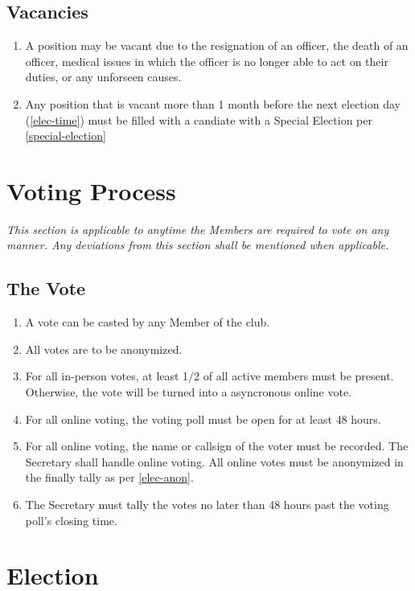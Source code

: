 \documentclass[a4paper,12pt]{article}
\begin{document}
\subsection{Vacancies}
\begin{enumerate}
  \item A position may be vacant due to the resignation of an officer, the death of an officer, medical issues in which the officer is no longer able to act on their duties, or any unforseen causes.
  \item Any position that is vacant more than 1 month before the next election day (\cref{elec-time}) must be filled with a candiate with a Special Election per \cref{special-election}
\end{enumerate}

\section{Voting Process} \label{Voting}
\textit{This section is applicable to anytime the Members are required to vote on any manner. Any deviations from this section shall be mentioned when applicable.}
\subsection{The Vote}
\begin{enumerate}
  \item A vote can be casted by any Member of the club.
  \item \label{elec-anon} All votes are to be anonymized.
  \item For all in-person votes, at least 1/2 of all active members must be present. Otherwise, the vote will be turned into a asyncronous online vote.
  \item For all online voting, the voting poll must be open for at least 48 hours.
  \item For all online voting, the name or callsign of the voter must be recorded. The Secretary shall handle online voting. All online votes must be anonymized in the finally tally as per \cref{elec-anon}.
  \item The Secretary must tally the votes no later than 48 hours past the voting poll's closing time.
\end{enumerate}

\section{Election}
\end{document}
